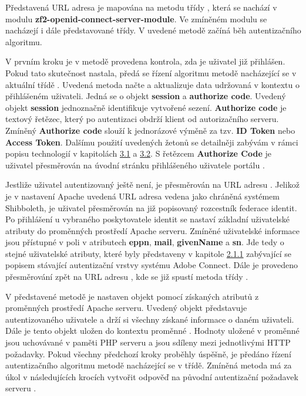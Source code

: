 \documentclass[
  printed, %
  twoside, %
  table,   %
  nolof,     %
  nolot,     %
]{fithesis3}
\begin{document}
Představená URL adresa je mapována na metodu  třídy , která se nachází v modulu \textbf{zf2-openid-connect-server-module}. Ve zmíněném modulu  se nacházejí i dále představované třídy. V uvedené metodě  začíná běh autentizačního algoritmu. \par 

V prvním kroku je v metodě  provedena kontrola, zda je uživatel již přihlášen. Pokud tato skutečnost nastala, předá se řízení algoritmu metodě  nacházející se v aktuální třídě . Uvedená metoda načte a aktualizuje data udržovaná v kontextu o přihlášeném uživateli. Jedná se o objekt \textbf{session} a \textbf{authorize code}. Uvedený objekt \textbf{session} jednoznačně identifikuje vytvořené sezení. \textbf{Authorize code} je textový řetězec, který po autentizaci obdrží klient od autorizačního serveru. Zmíněný \textbf{Authorize code} slouží k jednorázové výměně za tzv. \textbf{ID Token} nebo \textbf{Access Token}. Dalšímu použití uvedených žetonů se detailněji zabývám v rámci popisu technologií v kapitolách \hyperref[sec:oauth]{3.1} a \hyperref[sec:oidc]{3.2}. S řetězcem \textbf{Authorize Code} je uživatel přesměrován na úvodní stránku přihlášeného uživatele portálu . \par 

Jestliže uživatel autentizovaný ještě není, je přesměrován na URL adresu . Jelikož je v nastavení Apache uvedená URL adresa vedena jako chráněná systémem Shibboleth, je uživatel přesměrován na již popisovaný rozcestník federace identit. Po přihlášení u vybraného poskytovatele identit se nastaví základní uživatelské atributy do proměnných prostředí Apache serveru. Zmíněné uživatelské informace jsou přístupné v poli  v atributech \textbf{eppn}, \textbf{mail}, \textbf{givenName} a \textbf{sn}. Jde tedy o stejné uživatelské atributy, které byly představeny v kapitole \hyperref[item:adobe-connect]{2.1.1} zabývající se popisem stávající autentizační vrstvy systému Adobe Connect. Dále je provedeno přesměrování zpět na URL adresu , kde se již spustí metoda  třídy . \par

V představené metodě  je nastaven objekt  pomocí získaných atributů z proměnných prostředí Apache serveru. Uvedený objekt představuje autentizovaného uživatele a drží si všechny získané informace o daném uživateli. Dále je tento objekt uložen do kontextu proměnné . Hodnoty uložené v proměnné  jsou uchovávané v paměti PHP serveru a jsou sdíleny mezi jednotlivými HTTP požadavky. Pokud všechny předchozí kroky proběhly úspěšně, je předáno řízení autentizačního algoritmu metodě  nacházející se v třídě\break {}. Zmíněná metoda má za úkol v následujících krocích vytvořit odpověď na původní autentizační požadavek serveru . \par
\end{document}
